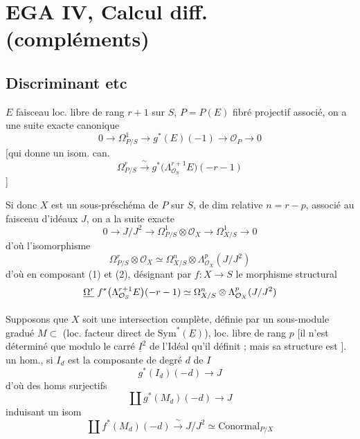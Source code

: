 \documentclass[11pt,a4paper]{article}
\begin{document}
\section{EGA IV, Calcul diff. (compléments)}

\subsection{Discriminant etc}

$E$ faisceau loc. libre de rang $r+1$ sur $S$, $P = P(E)$ fibré projectif
associé, on a une suite exacte canonique
\[
  0 \longrightarrow \Omega^{1}_{P/S} \longrightarrow g^{*}(E)(-1)
  \longrightarrow \mathcal{O}_{P} \longrightarrow 0
\]
[qui donne un isom. can.
\[
  \tag{1}
  \Omega^{r}_{P/S} \xrightarrow{\;\sim\;}
  g^{*}\bigl(\Lambda^{r+1}_{\mathcal{O}_S} E\bigr)(-r-1)
\]
]

Si donc $X$ est un sous-préschéma de $P$  sur $S$, de dim
relative $n = r - p$, associé au faisceau \struck{\ill{}} d'idéaux $J$, on a
la suite exacte
\[
  0 \longrightarrow J/J^{2} \longrightarrow \Omega^{1}_{P/S} \otimes \mathcal{O}_X
  \longrightarrow \Omega^{1}_{X/S} \longrightarrow 0
\]
d'où l'isomorphisme
\[
  \tag{2}
  \Omega^{r}_{P/S} \otimes \mathcal{O}_X \simeq
  \Omega^{n}_{X/S} \otimes \Lambda^{p}_{\mathcal{O}_X}(J/J^{2})
\]
d'où en composant (1) et (2), désignant par $f : X \to S$ le morphisme
structural
\[
  \struck{\Omega^{r}}\; f^{*}\bigl(\Lambda^{r+1}_{\mathcal{O}_S} E\bigr)(-r-1)
  \simeq \Omega^{n}_{X/S} \otimes \Lambda^{p}_{\mathcal{O}_X}(J/J^{2})
\]

Supposons que $X$ soit une intersection complète, définie par un sous-module
gradué $M \subset$  (loc. facteur direct de
$\mathrm{Sym}^{*}(\underline{E})$), \struck{\ill{}} loc. libre de rang $p$
[il n'est  déterminé que modulo le carré $\underline{I}^{2}$
de l'Idéal qu'il définit ; mais sa structure est ].
\ill{} un hom., si $I_d$ est la composante de degré $d$ de $I$
\[
  g^{*}(I_d)(-d) \longrightarrow J
\]
d'où des homs surjectifs
\[
  \coprod g^{*}(M_d)(-d) \longrightarrow J
\]
induisant un isom
\[
  \coprod f^{*}(M_d)(-d) \xrightarrow{\;\sim\;} J/J^{2} \simeq
  \mathrm{Conormal}_{P/X}
\]
\end{document}
